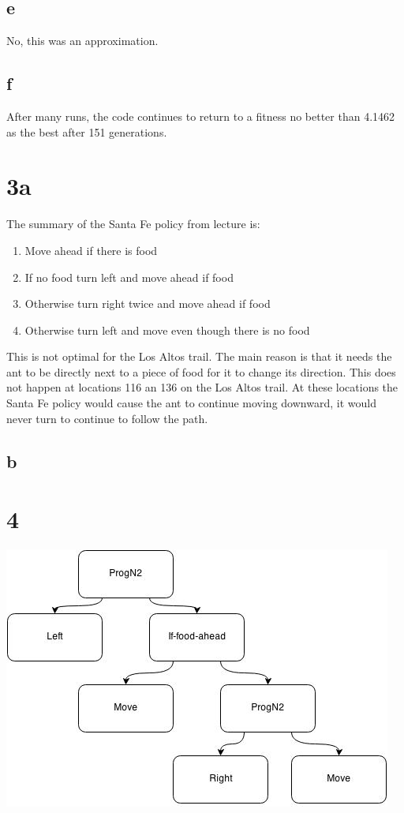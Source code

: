 \documentclass[12pt]{article}
\begin{document}
\subsection{e}
No, this was an approximation.

\subsection{f}
After many runs, the code continues to return to a fitness no better than 4.1462 as the best after 151 generations.

\section{3a}
The summary of the Santa Fe policy from lecture is:
\begin{enumerate}
  \item Move ahead if there is food
  \item If no food turn left and move ahead if food
  \item Otherwise turn right twice and move ahead if food
  \item Otherwise turn left and move even though there is no food
\end{enumerate}
This is not optimal for the Los Altos trail.  The main reason is that it needs the ant to be directly next to a piece of food for it to change its direction.  This does not happen at locations 116 an 136 on the Los Altos trail.  At these locations the Santa Fe policy would cause the ant to continue moving downward, it would never turn to continue to follow the path.

\subsection{b}

\section{4}
\includegraphics{problem4}
\end{document}
